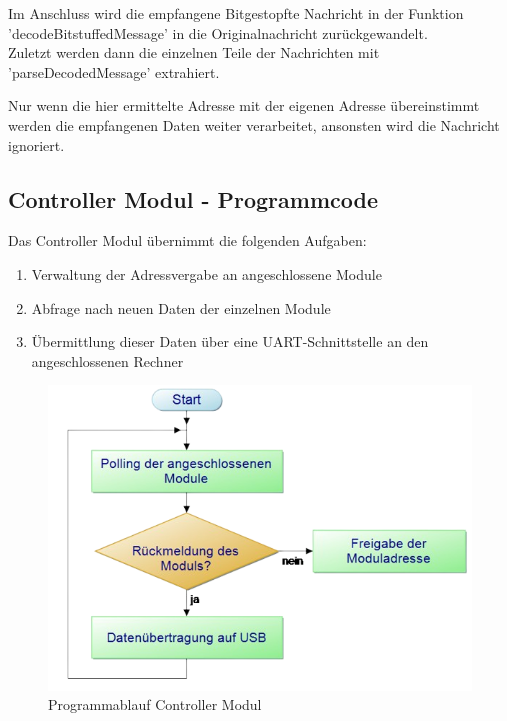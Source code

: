 

Im Anschluss wird die empfangene Bitgestopfte Nachricht in der Funktion 'decodeBitstuffedMessage' in die Originalnachricht zurückgewandelt.\\



Zuletzt werden dann die einzelnen Teile der Nachrichten mit 'parseDecodedMessage' extrahiert.



Nur wenn die hier ermittelte Adresse mit der eigenen Adresse übereinstimmt werden die empfangenen Daten weiter verarbeitet, ansonsten wird die Nachricht ignoriert.   

\subsection{Controller Modul - Programmcode}
Das Controller Modul übernimmt die folgenden Aufgaben:
\begin{enumerate}
    \item Verwaltung der Adressvergabe an angeschlossene Module
    \item Abfrage nach neuen Daten der einzelnen Module
    \item Übermittlung dieser Daten über eine UART-Schnittstelle an den angeschlossenen Rechner
\end{enumerate}

\begin{figure}[H]
	\centering    
	\includegraphics[width=.75\textwidth]{Bilder/pap_hauptmodul.png}
	\caption{Programmablauf Controller Modul}
	\label{Programm_Controller Modul}
\end{figure}
\textmd{
}

